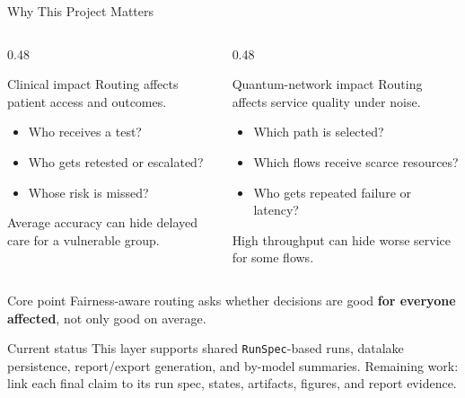 \begin{frame}{Why This Project Matters}
\begin{columns}[T]
\begin{column}{0.48\textwidth}
\begin{block}{Clinical impact}
Routing affects patient access and outcomes.
\end{block}
\begin{itemize}
    \item Who receives a test?
    \item Who gets retested or escalated?
    \item Whose risk is missed?
\end{itemize}
\alert{Average accuracy can hide delayed care for a vulnerable group.}
\end{column}

\begin{column}{0.48\textwidth}
\begin{block}{Quantum-network impact}
Routing affects service quality under noise.
\end{block}
\begin{itemize}
    \item Which path is selected?
    \item Which flows receive scarce resources?
    \item Who gets repeated failure or latency?
\end{itemize}
\alert{High throughput can hide worse service for some flows.}
\end{column}
\end{columns}

\vspace{0.35em}
\begin{block}{Core point}
Fairness-aware routing asks whether decisions are good \textbf{for everyone affected}, not only good on average.
\end{block}
\end{frame}

\begin{block}{Current status}
This layer supports shared \texttt{RunSpec}-based runs, datalake persistence, report/export generation, and by-model summaries. Remaining work: link each final claim to its run spec, states, artifacts, figures, and report evidence.
\end{block}

